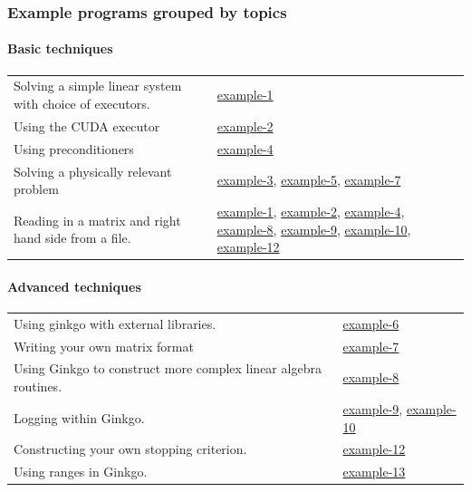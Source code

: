 \label{_topic}%
 \subsubsection*{Example programs grouped by topics}

\paragraph*{{\bfseries Basic techniques}}

\tabulinesep=1mm
\begin{longtabu} spread 0pt [c]{*{2}{|X[-1]}|}
\hline
Solving a simple linear system with choice of executors.  &\hyperlink{example_1}{example-\/1}  

\\
Using the C\+U\+DA executor  &\hyperlink{example_2}{example-\/2}  

\\
Using preconditioners  &\hyperlink{example_4}{example-\/4}  

\\
Solving a physically relevant problem  &\hyperlink{example_3}{example-\/3}, \hyperlink{example_5}{example-\/5}, \hyperlink{example_7}{example-\/7}  

\\
Reading in a matrix and right hand side from a file.  &\hyperlink{example_1}{example-\/1}, \hyperlink{example_2}{example-\/2}, \hyperlink{example_4}{example-\/4}, \hyperlink{example_8}{example-\/8}, \hyperlink{example_9}{example-\/9}, \hyperlink{example_10}{example-\/10}, \hyperlink{example_12}{example-\/12}  

\\
\end{longtabu}


\paragraph*{{\bfseries Advanced techniques}}

\tabulinesep=1mm
\begin{longtabu} spread 0pt [c]{*{2}{|X[-1]}|}
\hline
Using ginkgo with external libraries.  &\hyperlink{example_6}{example-\/6}  

\\
Writing your own matrix format  &\hyperlink{example_7}{example-\/7}  

\\
Using Ginkgo to construct more complex linear algebra routines.  &\hyperlink{example_8}{example-\/8}  

\\
Logging within Ginkgo.  &\hyperlink{example_9}{example-\/9}, \hyperlink{example_10}{example-\/10}  

\\
Constructing your own stopping criterion.  &\hyperlink{example_12}{example-\/12}  

\\
Using ranges in Ginkgo.  &\hyperlink{example_13}{example-\/13}   \\
\end{longtabu}
